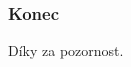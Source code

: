 \documentclass[xcolor=svgnames]{beamer}
\begin{document}
\begin{frame}
  \frametitle{Konec}
\begin{center} 
\huge  Díky za pozornost.
\end{center}
\end{frame}
\end{document}
